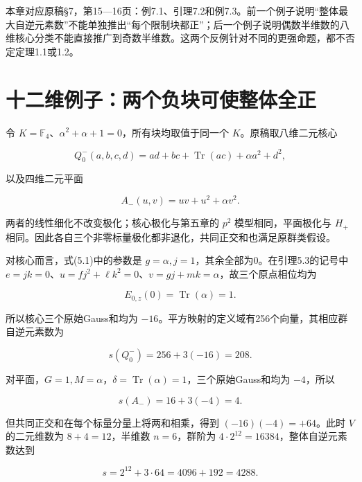 \documentclass[UTF8,fontset=fandol,zihao=-4,openany,oneside]{ctexbook}
\begin{document}
本章对应原稿§7，第15—16页：例7.1、引理7.2和例7.3。前一个例子说明“整体最大自逆元素数”不能单独推出“每个限制块都正”；后一个例子说明偶数半维数的八维核心分类不能直接推广到奇数半维数。这两个反例针对不同的更强命题，都不否定定理1.1或1.2。



\section{十二维例子：两个负块可使整体全正}


令 \(K=\mathbb F_4\)、\(\alpha^2+\alpha+1=0\)，所有块均取值于同一个 \(K\)。原稿取八维二元核心



\[
Q_0^-(a,b,c,d)=ad+bc+\operatorname{Tr}(ac)+\alpha a^2+d^2,
\]



以及四维二元平面



\[
A_-(u,v)=uv+u^2+\alpha v^2.
\]



两者的线性细化不改变极化；核心极化与第五章的 \(p^2\) 模型相同，平面极化与 \(H_+\) 相同。因此各自三个非零标量极化都非退化，共同正交和也满足原群类假设。



对核心而言，式(5.1)中的参数是 \(g=\alpha,j=1\)，其余全部为0。在引理5.3的记号中 \(e=jk=0\)、\(u=fj^2+\ell k^2=0\)、\(v=gj+mk=\alpha\)，故三个原点相位均为



\[
E_{0,z}(0)=\operatorname{Tr}(\alpha)=1.
\]



所以核心三个原始Gauss和均为 \(-16\)。平方映射的定义域有256个向量，其相应群自逆元素数为



\[
s(Q_0^-)=256+3(-16)=208.
\]



对平面，\(G=1,M=\alpha\)，\(\delta=\operatorname{Tr}(\alpha)=1\)，三个原始Gauss和均为 \(-4\)，所以



\[
s(A_-)=16+3(-4)=4.
\]



但共同正交和在每个标量分量上将两和相乘，得到 \((-16)(-4)=+64\)。此时 \(V\) 的二元维数为 \(8+4=12\)，半维数 \(n=6\)，群阶为 \(4\cdot2^{12}=16384\)，整体自逆元素数达到



\[
s=2^{12}+3\cdot64=4096+192=4288.
\]
\end{document}
